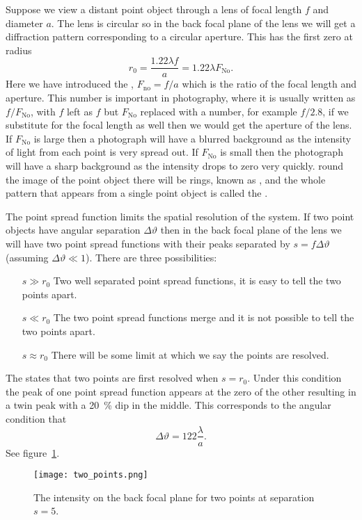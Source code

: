 \documentclass[a4paper]{article}
\begin{document}
    Suppose we view a distant point object through a lens of focal length \(f\) and diameter \(a\).
    The lens is circular so in the back focal plane of the lens we will get a diffraction pattern corresponding to a circular aperture.
    This has the first zero at radius
    \[r_0 = \frac{1.22 \lambda f}{a} = 1.22\lambda F_{\mathrm{No}}.\]
    Here we have introduced the , \(F_\mathrm{no} = f/a\) which is the ratio of the focal length and aperture.
    This number is important in photography, where it is usually written as \(f/F_{\mathrm{No}}\), with \(f\) left as \(f\) but \(F_{\mathrm{No}}\) replaced with a number, for example \(f/2.8\), if we substitute for the focal length as well then we would get the aperture of the lens.
    If \(F_{\mathrm{No}}\) is large then a photograph will have a blurred background as the intensity of light from each point is very spread out.
    If \(F_{\mathrm{No}}\) is small then the photograph will have a sharp background as the intensity drops to zero very quickly.
    round the image of the point object there will be rings, known as , and the whole pattern that appears from a single point object is called the .
    
    The point spread function limits the spatial resolution of the system.
    If two point objects have angular separation \(\Delta\vartheta\) then in the back focal plane of the lens we will have two point spread functions with their peaks separated by \(s = f\Delta \vartheta\) (assuming \(\Delta\vartheta\ll 1\)).
    There are three possibilities:
    \begin{itemize}
        \item[\(s \gg r_0\)] Two well separated point spread functions, it is easy to tell the two points apart.
        \item[\(s \ll r_0\)] The two point spread functions merge and it is not possible to tell the two points apart.
        \item[\(s\approx r_0\)] There will be some limit at which we say the points are resolved.
    \end{itemize}
    The  states that two points are first resolved when \(s = r_0\).
    Under this condition the peak of one point spread function appears at the zero of the other resulting in a twin peak with a \SI{20}{\percent} dip in the middle.
    This corresponds to the angular condition that
    \[\Delta\vartheta = 122\frac{\lambda}{a}.\]
    See figure~\ref{fig:two points}.
    \begin{figure}[htb]
        \centering
        \texttt{[image: two\_points.png]}
        \caption{The intensity on the back focal plane for two points at separation \(s = 5\).}
        \label{fig:two points}
    \end{figure}
    
\end{document}
